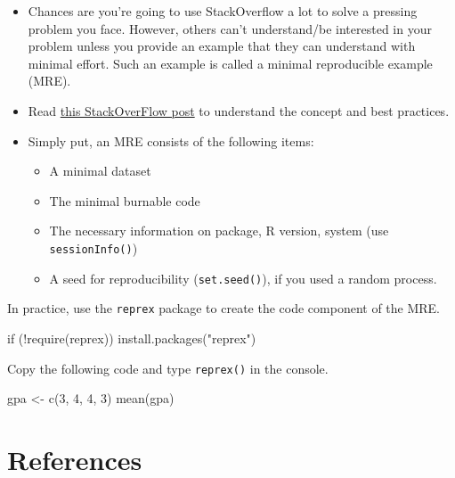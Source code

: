\documentclass[
  letterpaper,
  DIV=11,
  numbers=noendperiod]{scrreprt}
\newenvironment{Shaded}{\begin{snugshade}}{\end{snugshade}}
\newcommand{\ControlFlowTok}[1]{\textcolor[rgb]{0.00,0.23,0.31}{#1}}
\newcommand{\DecValTok}[1]{\textcolor[rgb]{0.68,0.00,0.00}{#1}}
\newcommand{\FunctionTok}[1]{\textcolor[rgb]{0.28,0.35,0.67}{#1}}
\newcommand{\NormalTok}[1]{\textcolor[rgb]{0.00,0.23,0.31}{#1}}
\newcommand{\OtherTok}[1]{\textcolor[rgb]{0.00,0.23,0.31}{#1}}
\newcommand{\SpecialCharTok}[1]{\textcolor[rgb]{0.37,0.37,0.37}{#1}}
\newcommand{\StringTok}[1]{\textcolor[rgb]{0.13,0.47,0.30}{#1}}
\providecommand{\tightlist}{%
  \setlength{\itemsep}{0pt}\setlength{\parskip}{0pt}}\usepackage{longtable,booktabs,array}
\begin{document}
\begin{itemize}
\item
  Chances are you're going to use StackOverflow a lot to solve a
  pressing problem you face. However, others can't understand/be
  interested in your problem unless you provide an example that they can
  understand with minimal effort. Such an example is called a minimal
  reproducible example (MRE).
\item
  Read
  \href{https://stackoverflow.com/questions/5963269/how-to-make-a-great-r-reproducible-example}{this
  StackOverFlow post} to understand the concept and best practices.
\item
  Simply put, an MRE consists of the following items:

  \begin{itemize}
  \tightlist
  \item
    A minimal dataset
  \item
    The minimal burnable code
  \item
    The necessary information on package, R version, system (use
    \texttt{sessionInfo()})
  \item
    A seed for reproducibility (\texttt{set.seed()}), if you used a
    random process.
  \end{itemize}
\end{itemize}

In practice, use the \texttt{reprex} package to create the code
component of the MRE.

\begin{Shaded}
\begin{Highlighting}[]
\ControlFlowTok{if}\NormalTok{ (}\SpecialCharTok{!}\FunctionTok{require}\NormalTok{(reprex)) }\FunctionTok{install.packages}\NormalTok{(}\StringTok{"reprex"}\NormalTok{)}
\end{Highlighting}
\end{Shaded}

Copy the following code and type \texttt{reprex()} in the console.

\begin{Shaded}
\begin{Highlighting}[]
\NormalTok{gpa }\OtherTok{\textless{}{-}} \FunctionTok{c}\NormalTok{(}\DecValTok{3}\NormalTok{, }\DecValTok{4}\NormalTok{, }\DecValTok{4}\NormalTok{, }\DecValTok{3}\NormalTok{)}
\FunctionTok{mean}\NormalTok{(gpa)}
\end{Highlighting}
\end{Shaded}

\hypertarget{references-2}{%
\section*{References}\label{references-2}}
\end{document}
